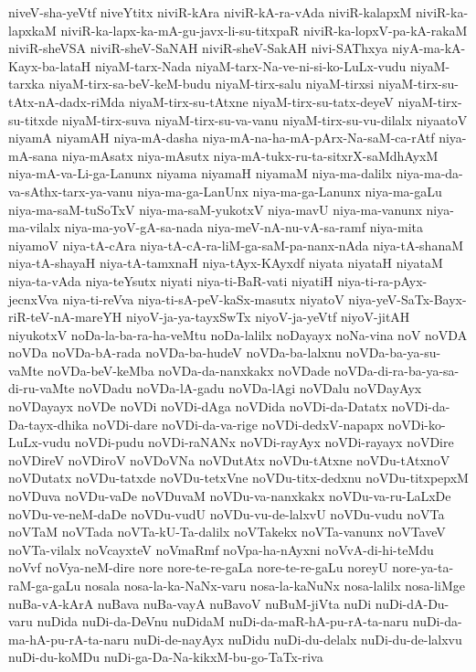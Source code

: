 {niveV-sha-yeVtf
niveYtitx
niviR-kAra
niviR-kA-ra-vAda
niviR-kalapxM
niviR-ka-lapxkaM
niviR-ka-lapx-ka-mA-gu-javx-li-su-titxpaR
niviR-ka-lopxV-pa-kA-rakaM
niviR-sheVSA
niviR-sheV-SaNAH
niviR-sheV-SakAH
nivi-SAThxya
niyA-ma-kA-Kayx-ba-lataH
niyaM-tarx-Nada
niyaM-tarx-Na-ve-ni-si-ko-LuLx-vudu
niyaM-tarxka
niyaM-tirx-sa-beV-keM-budu
niyaM-tirx-salu
niyaM-tirxsi
niyaM-tirx-su-tAtx-nA-dadx-riMda
niyaM-tirx-su-tAtxne
niyaM-tirx-su-tatx-deyeV
niyaM-tirx-su-titxde
niyaM-tirx-suva
niyaM-tirx-su-va-vanu
niyaM-tirx-su-vu-dilalx
niyaatoV
niyamA
niyamAH
niya-mA-dasha
niya-mA-na-ha-mA-pArx-Na-saM-ca-rAtf
niya-mA-sana
niya-mAsatx
niya-mAsutx
niya-mA-tukx-ru-ta-sitxrX-saMdhAyxM
niya-mA-va-Li-ga-Lanunx
niyama
niyamaH
niyamaM
niya-ma-dalilx
niya-ma-da-va-sAthx-tarx-ya-vanu
niya-ma-ga-LanUnx
niya-ma-ga-Lanunx
niya-ma-gaLu
niya-ma-saM-tuSoTxV
niya-ma-saM-yukotxV
niya-mavU
niya-ma-vanunx
niya-ma-vilalx
niya-ma-yoV-gA-sa-nada
niya-meV-nA-nu-vA-sa-ramf
niya-mita
niyamoV
niya-tA-cAra
niya-tA-cA-ra-liM-ga-saM-pa-nanx-nAda
niya-tA-shanaM
niya-tA-shayaH
niya-tA-tamxnaH
niya-tAyx-KAyxdf
niyata
niyataH
niyataM
niya-ta-vAda
niya-teYsutx
niyati
niya-ti-BaR-vati
niyatiH
niya-ti-ra-pAyx-jecnxVva
niya-ti-reVva
niya-ti-sA-peV-kaSx-masutx
niyatoV
niya-yeV-SaTx-Bayx-riR-teV-nA-mareYH
niyoV-ja-ya-tayxSwTx
niyoV-ja-yeVtf
niyoV-jitAH
niyukotxV
noDa-la-ba-ra-ha-veMtu
noDa-lalilx
noDayayx
noNa-vina
noV
noVDA
noVDa
noVDa-bA-rada
noVDa-ba-hudeV
noVDa-ba-lalxnu
noVDa-ba-ya-su-vaMte
noVDa-beV-keMba
noVDa-da-nanxkakx
noVDade
noVDa-di-ra-ba-ya-sa-di-ru-vaMte
noVDadu
noVDa-lA-gadu
noVDa-lAgi
noVDalu
noVDayAyx
noVDayayx
noVDe
noVDi
noVDi-dAga
noVDida
noVDi-da-Datatx
noVDi-da-Da-tayx-dhika
noVDi-dare
noVDi-da-va-rige
noVDi-dedxV-napapx
noVDi-ko-LuLx-vudu
noVDi-pudu
noVDi-raNANx
noVDi-rayAyx
noVDi-rayayx
noVDire
noVDireV
noVDiroV
noVDoVNa
noVDutAtx
noVDu-tAtxne
noVDu-tAtxnoV
noVDutatx
noVDu-tatxde
noVDu-tetxVne
noVDu-titx-dedxnu
noVDu-titxpepxM
noVDuva
noVDu-vaDe
noVDuvaM
noVDu-va-nanxkakx
noVDu-va-ru-LaLxDe
noVDu-ve-neM-daDe
noVDu-vudU
noVDu-vu-de-lalxvU
noVDu-vudu
noVTa
noVTaM
noVTada
noVTa-kU-Ta-dalilx
noVTakekx
noVTa-vanunx
noVTaveV
noVTa-vilalx
noVcayxteV
noVmaRmf
noVpa-ha-nAyxni
noVvA-di-hi-teMdu
noVvf
noVya-neM-dire
nore
nore-te-re-gaLa
nore-te-re-gaLu
noreyU
nore-ya-ta-raM-ga-gaLu
nosala
nosa-la-ka-NaNx-varu
nosa-la-kaNuNx
nosa-lalilx
nosa-liMge
nuBa-vA-kArA
nuBava
nuBa-vayA
nuBavoV
nuBuM-jiVta
nuDi
nuDi-dA-Du-varu
nuDida
nuDi-da-DeVnu
nuDidaM
nuDi-da-maR-hA-pu-rA-ta-naru
nuDi-da-ma-hA-pu-rA-ta-naru
nuDi-de-nayAyx
nuDidu
nuDi-du-delalx
nuDi-du-de-lalxvu
nuDi-du-koMDu
nuDi-ga-Da-Na-kikxM-bu-go-TaTx-riva
}

